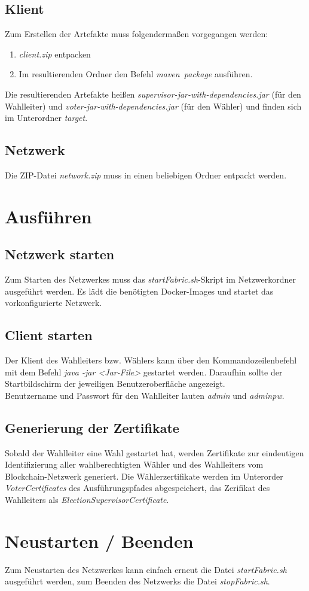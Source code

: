 \documentclass[parskip=full]{scrartcl}
\newcommand{\textitx}[1]{\mbox{\textit{#1}}}
\begin{document}
	\subsection{Klient}
	Zum Erstellen der Artefakte muss folgendermaßen vorgegangen werden:
	\begin{enumerate}
		\item \textit{client.zip} entpacken
		\item Im resultierenden Ordner den Befehl \textitx{maven package} ausführen.
	\end{enumerate}
	Die resultierenden Artefakte heißen \textit{supervisor-jar-with-dependencies.jar} (für den Wahlleiter) und \textit{voter-jar-with-dependencies.jar} (für den Wähler) und finden sich im Unterordner \textit{target}.
	\subsection{Netzwerk}
	Die ZIP-Datei \textit{network.zip} muss in einen beliebigen Ordner entpackt werden. 

	\section{Ausführen}
	\subsection{Netzwerk starten}
	Zum Starten des Netzwerkes muss das \textit{startFabric.sh}-Skript im Netzwerkordner ausgeführt werden. Es lädt die benötigten Docker-Images und startet das vorkonfigurierte Netzwerk.
	\subsection{Client starten}
	Der Klient des Wahlleiters bzw. Wählers kann über den Kommandozeilenbefehl mit dem Befehl \textit{java -jar <Jar-File>} gestartet werden. Daraufhin sollte der Startbildschirm der jeweiligen Benutzeroberfläche angezeigt. \\
	Benutzername und Passwort für den Wahlleiter lauten \textit{admin} und \textit{adminpw}.

    \subsection{Generierung der Zertifikate}
    Sobald der Wahlleiter eine Wahl gestartet hat, werden Zertifikate zur eindeutigen Identifizierung aller wahlberechtigten Wähler und des Wahlleiters vom Blockchain-Netzwerk generiert. Die Wählerzertifikate werden im Unterorder \textit{VoterCertificates} des Ausführungspfades abgespeichert, das Zerifikat des Wahlleiters als \textit{ElectionSupervisorCertificate}.
    
    \section{Neustarten / Beenden}
    Zum Neustarten des Netzwerkes kann einfach erneut die Datei \textit{startFabric.sh} ausgeführt werden,
    zum Beenden des Netzwerks die Datei \textit{stopFabric.sh}.
		
\end{document}
